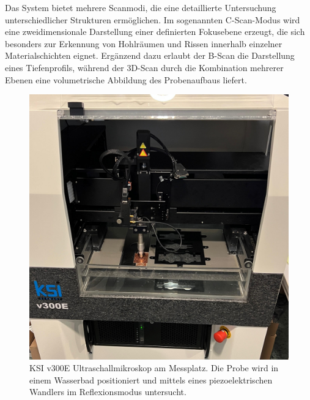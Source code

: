 Das System bietet mehrere Scanmodi, die eine detaillierte Untersuchung unterschiedlicher Strukturen ermöglichen. Im sogenannten C-Scan-Modus wird eine zweidimensionale Darstellung einer definierten Fokusebene erzeugt, die sich besonders zur Erkennung von Hohlräumen und Rissen innerhalb einzelner Materialschichten eignet. Ergänzend dazu erlaubt der B-Scan die Darstellung eines Tiefenprofils, während der 3D-Scan durch die Kombination mehrerer Ebenen eine volumetrische Abbildung des Probenaufbaus liefert.


\begin{figure}[htbp]
    \centering
    \includegraphics[scale=0.11]{Bilder/ksiv8}
    \caption{KSI v300E Ultraschallmikroskop am Messplatz. Die Probe wird in einem Wasserbad positioniert und mittels eines piezoelektrischen Wandlers im Reflexionsmodus untersucht.}
    \vspace{0.2cm}
    \label{Abb.2: KSI v300E Ultraschallmikroskop am Messplatz. Die Probe wird in einem Wasserbad positioniert und mittels eines piezoelektrischen Wandlers im Reflexionsmodus untersucht. }
\end{figure} 
\vspace{0.2cm}
